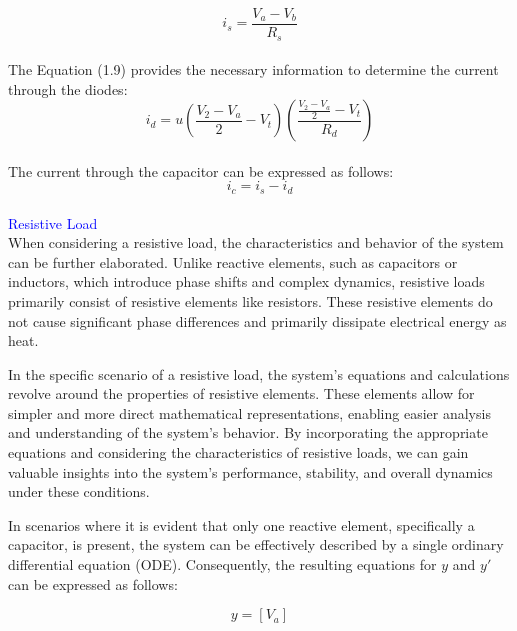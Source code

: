 \begin{equation}
    i_s=\frac{V_a-V_b}{R_s}
\end{equation}\\

The Equation (1.9) provides the necessary information to determine the current through the diodes:\\

\begin{equation}
    i_d=u(\frac{V_2-V_a}{2}-V_t)(\frac{\frac{V_2-V_a}{2}-V_t}{R_d})
\end{equation}\\

The current through the capacitor can be expressed as follows:\\

\begin{equation}
    i_c=i_s-i_d
\end{equation}\\

\textcolor{blue}{Resistive Load}\\

When considering a resistive load, the characteristics and behavior of the system can be further elaborated. Unlike reactive elements, such as capacitors or inductors, which introduce phase shifts and complex dynamics, resistive loads primarily consist of resistive elements like resistors. These resistive elements do not cause significant phase differences and primarily dissipate electrical energy as heat.

In the specific scenario of a resistive load, the system's equations and calculations revolve around the properties of resistive elements. These elements allow for simpler and more direct mathematical representations, enabling easier analysis and understanding of the system's behavior. By incorporating the appropriate equations and considering the characteristics of resistive loads, we can gain valuable insights into the system's performance, stability, and overall dynamics under these conditions.

In scenarios where it is evident that only one reactive element, specifically a capacitor, is present, the system can be effectively described by a single ordinary differential equation (ODE). Consequently, the resulting equations for $y$ and $y'$ can be expressed as follows:

\begin{equation}
    y=[V_a]
\end{equation}\\

